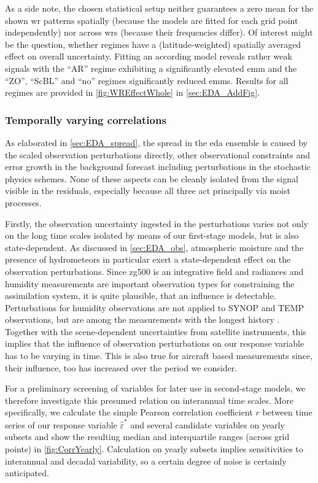 As a side note, the chosen statistical setup neither guarantees a zero mean for the shown \gls{wr} patterns spatially (because the models are fitted for each grid point independently) nor across \glspl{wr} (because their frequencies differ). Of interest might be the question, whether regimes have a (latitude-weighted) spatially averaged effect on overall uncertainty. Fitting an according model reveals rather weak signals with the \enquote{AR} regime exhibiting a significantly elevated \gls{emm} and the \enquote{ZO}, \enquote{ScBL} and \enquote{no} regimes significantly reduced \glspl{emm}. Results for all regimes are provided in \cref{fig:WREffectWhole} in \cref{sec:EDA_AddFig}.

\subsubsection{Temporally varying correlations}

As elaborated in \cref{sec:EDA_spread}, the spread in the \gls{eda} ensemble is caused by the scaled observation perturbations directly, other observational constraints and error growth in the background forecast including perturbations in the stochastic physics schemes. None of these aspects can be cleanly isolated from the signal visible in the residuals, especially because all three act principally via moist processes.

Firstly, the observation uncertainty ingested in the perturbations varies not only on the long time scales isolated by means of our first-stage models, but is also state-dependent. As discussed in \cref{sec:EDA_obs}, atmospheric moisture and the presence of hydrometeors in particular exert a state-dependent effect on the observation perturbations. Since \gls{zg500} is an integrative field and radiances and humidity measurements are important observation types for constraining the assimilation system, it is quite plausible, that an influence is detectable. Perturbations for humidity observations are not applied to SYNOP and TEMP observations, but are among the measurements with the longest history \parencite{sociERA5GlobalReanalysis2024}. Together with the scene-dependent uncertainties from satellite instruments, this implies that the influence of observation perturbations on our response variable has to be varying in time. This is also true for aircraft based measurements since, their influence, too has increased over the period we consider.

For a preliminary screening of variables for later use in second-stage models, we therefore investigate this presumed relation on interannual time scales. More specifically, we calculate the simple Pearson correlation coefficient $r$ \parencite[ch.~3]{StatisticalMethodsAtmospheric2019} between time series of our response variable $\hat{\varepsilon}^*$ and several candidate variables on yearly subsets and show the resulting median and interquartile ranges (across grid points) in \cref{fig:CorrYearly}. Calculation on yearly subsets implies sensitivities to interannual and decadal variability, so a certain degree of noise is certainly anticipated.

